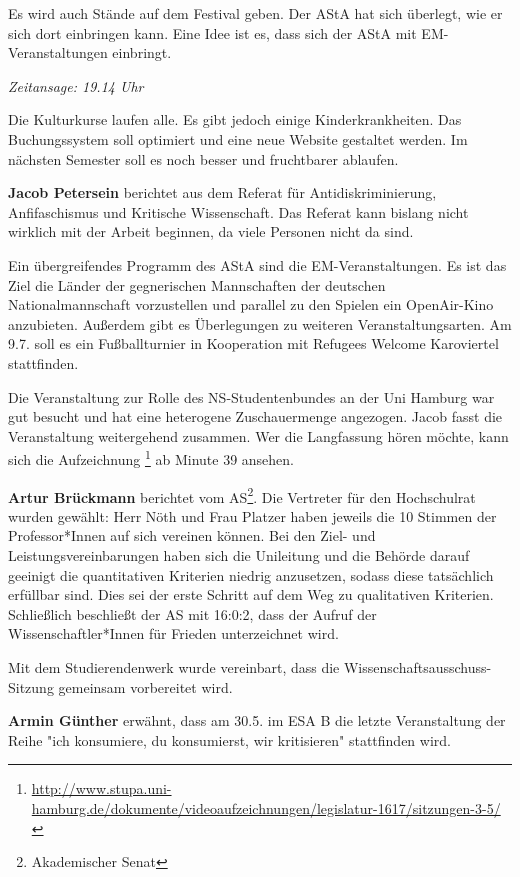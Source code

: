 \documentclass[ngerman,headheight=70pt]{scrartcl}
\begin{document}
    Es wird auch Stände auf dem Festival geben. Der AStA hat sich überlegt, wie
    er sich dort einbringen kann. Eine Idee ist es, dass sich der AStA mit
    EM-Veranstaltungen einbringt.

    \textit{Zeitansage: 19.14 Uhr}

    Die Kulturkurse laufen alle. Es gibt jedoch einige Kinderkrankheiten. Das
    Buchungssystem soll optimiert und eine neue Website gestaltet werden. Im
    nächsten Semester soll es noch besser und fruchtbarer ablaufen.

    \textbf{Jacob Petersein} berichtet aus dem Referat für Antidiskriminierung,
    Anfifaschismus und Kritische Wissenschaft. Das Referat kann bislang nicht
    wirklich mit der Arbeit beginnen, da viele Personen nicht da sind.

    Ein übergreifendes Programm des AStA sind die EM-Veranstaltungen. Es ist das
    Ziel die Länder der gegnerischen Mannschaften der deutschen Nationalmannschaft
    vorzustellen und parallel zu den Spielen ein OpenAir-Kino anzubieten. Außerdem
    gibt es Überlegungen zu weiteren Veranstaltungsarten. Am 9.7. soll es ein
    Fußballturnier in Kooperation mit Refugees Welcome Karoviertel stattfinden.

    Die Veranstaltung zur Rolle des NS-Studentenbundes an der Uni Hamburg war
    gut besucht und hat eine heterogene Zuschauermenge angezogen. Jacob fasst
    die Veranstaltung weitergehend zusammen. Wer die Langfassung hören möchte,
    kann sich die Aufzeichnung
    \footnote{\url{http://www.stupa.uni-hamburg.de/dokumente/videoaufzeichnungen/legislatur-1617/sitzungen-3-5/}}
    ab Minute 39 ansehen.

    \textbf{Artur Brückmann} berichtet vom AS\footnote{Akademischer Senat}.
    Die Vertreter für den Hochschulrat wurden gewählt: Herr Nöth und Frau Platzer
    haben jeweils die 10 Stimmen der Professor*Innen auf sich vereinen können.
    Bei den Ziel- und Leistungsvereinbarungen haben sich die Unileitung und die
    Behörde darauf geeinigt die quantitativen Kriterien niedrig anzusetzen, sodass
    diese tatsächlich erfüllbar sind. Dies sei der erste Schritt auf dem Weg zu
    qualitativen Kriterien. Schließlich beschließt der AS mit 16:0:2, dass der
    Aufruf der Wissenschaftler*Innen für Frieden unterzeichnet wird.

    Mit dem Studierendenwerk wurde vereinbart, dass die
    Wissenschaftsausschuss-Sitzung gemeinsam vorbereitet wird.

    \textbf{Armin Günther} erwähnt, dass am 30.5. im ESA B die letzte Veranstaltung
    der Reihe "ich konsumiere, du konsumierst, wir kritisieren" stattfinden wird.
\end{document}
